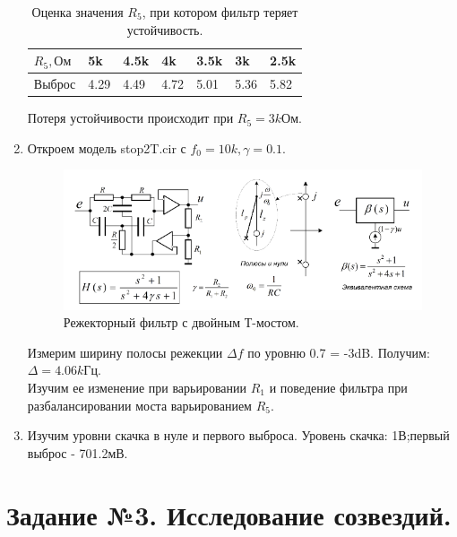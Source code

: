 \documentclass[12pt,a4paper]{article}
\begin{document}
\begin{enumerate}
    \begin{table}[H]
        \centering
        \begin{center}
        \end{center}
        \vspace{0.1cm}
        \label{tab:my_label}
        \begin{tabular}{ |p{2cm}|p{1cm}|p{1cm}|p{1cm}|p{1cm}|p{1cm}|p{1cm}|}
     \hline
    $R_5, Ом$ &  5k & 4.5k & 4k & 3.5k & 3k & 2.5k \\
    \hline
    Выброс &  4.29 & 4.49 & 4.72 & 5.01 & 5.36 & 5.82 \\
    \hline
    \end{tabular}
    \caption{Оценка значения $R_5$, при котором фильтр теряет устойчивость.}
    \end{table}
    Потеря устойчивости происходит при $R_5 = 3k Ом$.

    \item Откроем модель stop2T.cir с $f_0 = 10k, \gamma = 0.1$.
    
    \begin{figure}[H]
        \begin{center}
        \includegraphics[width=12cm]{режекторный.png}
        \caption{Режекторный фильтр с двойным Т-мостом.}
        \label{regekt} %
        \end{center}
    \end{figure}
    Измерим ширину полосы режекции $\varDelta f$ по уровню 0.7 = -3dB. Получим: $\varDelta = 4.06k$Гц. \\
    Изучим ее изменение при варьировании $R_1$ и поведение фильтра при разбалансировании моста варьированием $R_5$.
    \item Изучим уровни скачка в нуле и первого выброса. Уровень скачка: 1В;первый выброс - 701.2мВ.  
\end{enumerate}

\section{Задание №3. Исследование созвездий.}
\end{document}
